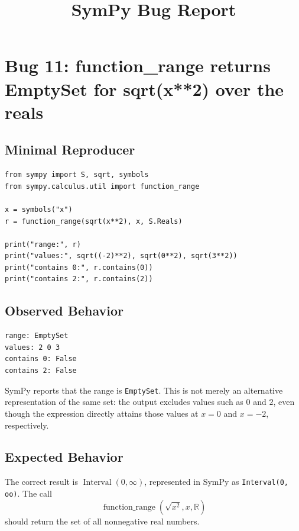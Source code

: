 \documentclass[11pt]{article}
\title{SymPy Bug Report}
\author{}
\date{}
\begin{document}
\maketitle

\section{Bug 11: function\_range returns EmptySet for sqrt(x**2) over the reals}

\subsection{Minimal Reproducer}

\medskip

\begin{lstlisting}[style=bugpython]
from sympy import S, sqrt, symbols
from sympy.calculus.util import function_range

x = symbols("x")
r = function_range(sqrt(x**2), x, S.Reals)

print("range:", r)
print("values:", sqrt((-2)**2), sqrt(0**2), sqrt(3**2))
print("contains 0:", r.contains(0))
print("contains 2:", r.contains(2))
\end{lstlisting}

\subsection{Observed Behavior}

\medskip

\begin{lstlisting}[style=bugpython]
range: EmptySet
values: 2 0 3
contains 0: False
contains 2: False
\end{lstlisting}

SymPy reports that the range is \texttt{EmptySet}. This is not merely an
alternative representation of the same set: the output excludes values such as
\(0\) and \(2\), even though the expression directly attains those values at
\(x=0\) and \(x=-2\), respectively.

\subsection{Expected Behavior}

The correct result is \(\operatorname{Interval}(0,\infty)\), represented in
SymPy as \texttt{Interval(0, oo)}. The call
\[
  \operatorname{function\_range}\!\left(\sqrt{x^2}, x, \mathbb{R}\right)
\]
should return the set of all nonnegative real numbers.
\end{document}
